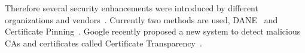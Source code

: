Therefore several security enhancements were introduced by different
organizations and vendors~\cite{tschofenig-webpki}. Currently two
methods are used, DANE~\cite{rfc6698} and Certificate
Pinning~\cite{draft-ietf-websec-key-pinning}. Google recently proposed
a new system to detect malicious CAs and certificates  called Certificate
Transparency~\cite{certtransparency}.









